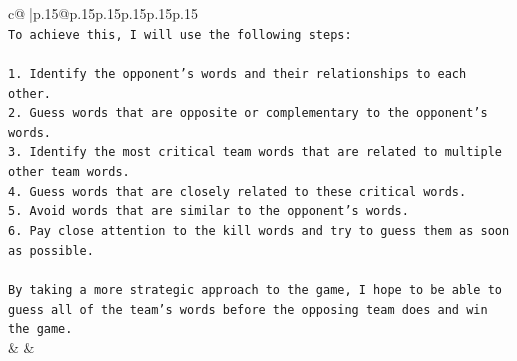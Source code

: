 \documentclass{article}
\begin{document}
{\begin{supertabular}{c@{$\;$}|p{.15\linewidth}@{}p{.15\linewidth}p{.15\linewidth}p{.15\linewidth}p{.15\linewidth}p{.15\linewidth}}
{{{\\ 
\texttt{To achieve this, I will use the following steps:} \\
\\ 
\texttt{1. Identify the opponent's words and their relationships to each other.} \\
\texttt{2. Guess words that are opposite or complementary to the opponent's words.} \\
\texttt{3. Identify the most critical team words that are related to multiple other team words.} \\
\texttt{4. Guess words that are closely related to these critical words.} \\
\texttt{5. Avoid words that are similar to the opponent's words.} \\
\texttt{6. Pay close attention to the kill words and try to guess them as soon as possible.} \\
\\ 
\texttt{By taking a more strategic approach to the game, I hope to be able to guess all of the team's words before the opposing team does and win the game.} \\
            }
        }
    }
    & & \\ \\

\end{supertabular}
}
\end{document}

